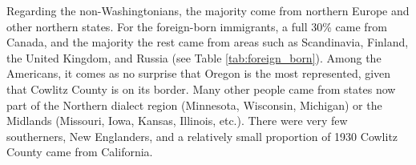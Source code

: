 \begin{table}[ht]
    \centering
    \caption[Number of non-Washingtonians by state living in Cowlitz County in 1930.]{Number of non-Washingtonians by state living in Cowlitz County in 1930. Only states that contributed to more than 2\% of the total non-Washingtonian population are included here, but all US states were represented in this community. There were 1250 people from the other states.}
    \label{tab:non_washingtonians}
\end{table}

Regarding the non-Washingtonians, the majority come from northern Europe and other northern states. For the foreign-born immigrants, a full 30\% came from Canada, and the majority the rest came from areas such as Scandinavia, Finland, the United Kingdom, and Russia (see Table \ref{tab:foreign_born}). Among the Americans, it comes as no surprise that Oregon is the most represented, given that Cowlitz County is on its border. Many other people came from states now part of the Northern dialect region (Minnesota, Wisconsin, Michigan) or the Midlands (Missouri, Iowa, Kansas, Illinois, etc.). There were very few southerners, New Englanders, and a relatively small proportion of 1930 Cowlitz County came from California.

